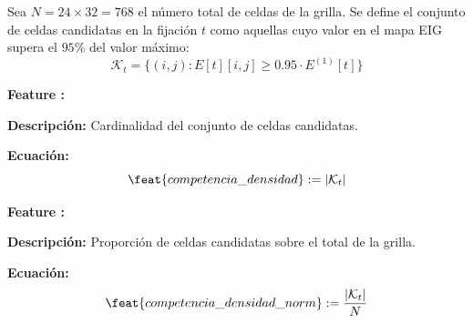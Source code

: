 Sea $N = 24 \times 32 = 768$ el número total de celdas de la grilla.
Se define el conjunto de celdas candidatas en la fijación $t$ como
aquellas cuyo valor en el mapa EIG supera el $95\%$ del valor máximo:
\begin{equation}
    \mathcal{K}_t = \{(i,j) : E[t][i,j] \geq 0.95 \cdot E^{(1)}[t]\}
\end{equation}

\begin{featuredef}
\textbf{Feature \thetcbcounter:} 

\textbf{Descripción:} Cardinalidad del conjunto de celdas candidatas.

\textbf{Ecuación:}
\begin{equation}
    \feat{competencia\_densidad} := |\mathcal{K}_t|
\end{equation}
\end{featuredef}

\begin{featuredef}
\textbf{Feature \thetcbcounter:} 

\textbf{Descripción:} Proporción de celdas candidatas sobre el total
de la grilla.

\textbf{Ecuación:}
\begin{equation}
    \feat{competencia\_densidad\_norm} := \frac{|\mathcal{K}_t|}{N}
\end{equation}
\end{featuredef}

